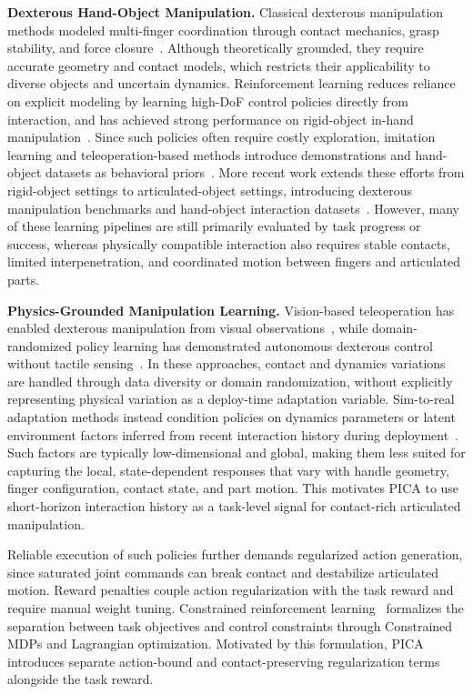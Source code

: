 \documentclass{article}
\begin{document}
\textbf{Dexterous Hand-Object Manipulation.}
Classical dexterous manipulation methods modeled multi-finger coordination through contact mechanics, grasp stability, and force closure~\cite{bicchi1995closure,okamura2000overview}. Although theoretically grounded, they require accurate geometry and contact models, which restricts their applicability to diverse objects and uncertain dynamics. Reinforcement learning reduces reliance on explicit modeling by learning high-DoF control policies directly from interaction, and has achieved strong performance on rigid-object in-hand manipulation~\cite{andrychowicz2020learning,rajeswaran2018learning,chen2021system}. Since such policies often require costly exploration, imitation learning and teleoperation-based methods introduce demonstrations and hand-object datasets as behavioral priors~\cite{qin2022dexmv,yang2022oakink,qin2023anyteleop,liu2022hoi4d}. More recent work extends these efforts from rigid-object settings to articulated-object settings, introducing dexterous manipulation benchmarks and hand-object interaction datasets~\cite{bao2023dexart,fan2023arctic}. However, many of these learning pipelines are still primarily evaluated by task progress or success, whereas physically compatible interaction also requires stable contacts, limited interpenetration, and coordinated motion between fingers and articulated parts.

\textbf{Physics-Grounded Manipulation Learning.}
Vision-based teleoperation has enabled dexterous manipulation from visual observations~\cite{handa2020dexpilot,qin2022onehand}, while domain-randomized policy learning has demonstrated autonomous dexterous control without tactile sensing~\cite{andrychowicz2020learning}. In these approaches, contact and dynamics variations are handled through data diversity or domain randomization, without explicitly representing physical variation as a deploy-time adaptation variable. Sim-to-real adaptation methods instead condition policies on dynamics parameters or latent environment factors inferred from recent interaction history during deployment~\cite{yu2017preparing,kumar2021rma}. Such factors are typically low-dimensional and global, making them less suited for capturing the local, state-dependent responses that vary with handle geometry, finger configuration, contact state, and part motion. This motivates PICA to use short-horizon interaction history as a task-level signal for contact-rich articulated manipulation.

Reliable execution of such policies further demands regularized action generation, since saturated joint commands can break contact and destabilize articulated motion. Reward penalties couple action regularization with the task reward and require manual weight tuning. Constrained reinforcement learning~\cite{achiam2017constrained,tessler2019reward} formalizes the separation between task objectives and control constraints through Constrained MDPs and Lagrangian optimization. Motivated by this formulation, PICA introduces separate action-bound and contact-preserving regularization terms alongside the task reward.
\end{document}
